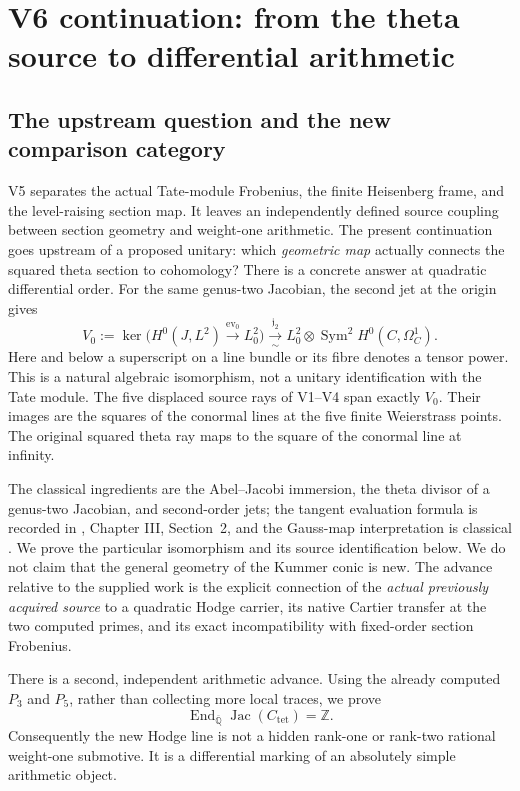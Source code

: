 \documentclass[11pt]{article}
\theoremstyle{definition}
\theoremstyle{remark}
\newcommand{\Q}{\mathbb Q}
\newcommand{\Z}{\mathbb Z}
\newcommand{\End}{\operatorname{End}}
\begin{document}
\section{V6 continuation: from the theta source to differential arithmetic}
\label{sec:v6-context}

\subsection{The upstream question and the new comparison category}
V5 separates the actual Tate-module Frobenius, the finite Heisenberg frame,
and the level-raising section map. It leaves an independently defined
source coupling between section geometry and weight-one arithmetic. The
present continuation goes upstream of a proposed unitary: which
\emph{geometric map} actually connects the squared theta section to
cohomology? There is a concrete answer at quadratic differential order.
For the same genus-two Jacobian, the second jet at the origin gives
\begin{equation}
 \boxed{
 V_0:=\ker\bigl(H^0(J,L^2)\xrightarrow{\mathrm{ev}_0}L_0^2\bigr)
 \xrightarrow[\sim]{\ \mathfrak j_2\ }
 L_0^2\otimes\operatorname{Sym}^2 H^0(C,\Omega_C^1).}
 \label{eq:v6-main-jet}
\end{equation}
Here and below a superscript on a line bundle or its fibre denotes a tensor
power. This is a natural algebraic isomorphism, not a unitary identification
with the Tate module. The five displaced source rays of V1--V4 span
exactly $V_0$. Their images are the squares of the conormal lines at the
five finite Weierstrass points. The original squared theta ray maps to
the square of the conormal line at infinity.

The classical ingredients are the Abel--Jacobi immersion, the theta divisor
of a genus-two Jacobian, and second-order jets; the tangent evaluation
formula is recorded in \cite{MilneAV}, Chapter III, Section~2, and the
Gauss-map interpretation is classical \cite{deJongGauss}. We prove the
particular isomorphism and its source identification below. We do not
claim that the general geometry of the Kummer conic is new. The advance
relative to the supplied work is the explicit connection of the
\emph{actual previously acquired source} to a quadratic Hodge carrier,
its native Cartier transfer at the two computed primes, and its exact
incompatibility with fixed-order section Frobenius.

There is a second, independent arithmetic advance. Using the already
computed $P_3$ and $P_5$, rather than collecting more local traces, we prove
\begin{equation}
 \boxed{\End_{\overline{\Q}}\operatorname{Jac}(C_{\mathrm{tet}})=\Z.}
 \label{eq:v6-main-End}
\end{equation}
Consequently the new Hodge line is not a hidden rank-one or rank-two
rational weight-one submotive. It is a differential marking of an
absolutely simple arithmetic object.
\end{document}
